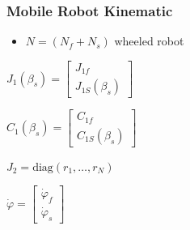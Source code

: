 \documentclass[a4paper]{article}
\begin{document}
\subsubsection{Mobile Robot Kinematic}
\begin{itemize}
    \item $N = (N_f + N_s)$ wheeled robot
\end{itemize}
\begin{itemize*}
    \item $J_1(\beta_s) =
        \begin{bmatrix}
            J_{1f}\\
            J_{1S}(\beta_s)
        \end{bmatrix}$
    \item $C_1(\beta_s) =
        \begin{bmatrix}
            C_{1f}\\
            C_{1S}(\beta_s)
        \end{bmatrix}$
    \item $J_2 = \mathrm{diag}(r_1, \dots, r_N)$
    \item $\dot \varphi =
        \begin{bmatrix}
            \dot \varphi_f\\
            \dot \varphi_s
        \end{bmatrix}$
\end{itemize*}
\end{document}

